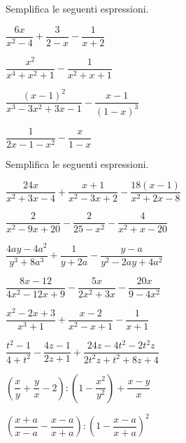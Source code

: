 \begin{esercizio}
\label{ese:19.34}
Semplifica le seguenti espressioni.
\begin{htmulticols}{2}
\begin{enumeratea}
\item \(\dfrac{6x}{x^{2}-4}+\dfrac{3}{2-x}-\dfrac{1}{x+2}\)
\item \(\dfrac{x^{2}}{x^{4}+x^{2}+1}-\dfrac{1}{x^{2}+x+1}\)
\item \(\dfrac{(x-1)^{2}}{x^{3}-3x^{2}+3x-1}-\dfrac{x-1}{(1-x)^{3}}\)
\item \(\dfrac{1}{2x-1-x^{2}}-\dfrac{x}{1-x}\)
\end{enumeratea}
\end{htmulticols}
\end{esercizio}

\begin{esercizio}[*]
\label{ese:19.35}
Semplifica le seguenti espressioni.
\begin{enumeratea}
\item 
\(\dfrac{24x}{x^{2}+3x-4}+\dfrac{x+1}{x^{2}-3x+2}-\dfrac{18(x-1)}{x^{2}+2x-8}\)
\item \(\dfrac{2}{x^{2}-9x+20}-\dfrac{2}{25-x^{2}}-\dfrac{4}{x^{2}+x-20}\)
\item 
\(\dfrac{4ay-4a^{2}}{y^{3}+8a^{3}}+\dfrac{1}{y+2a}-\dfrac{y-a}{y^{2}-2ay+4a^{2}}
\)
\item 
\(\dfrac{8x-12}{4x^{2}-12x+9}-\dfrac{5x}{2x^{2}+3x}-\dfrac{20x}{9-4x^{2}}\)
\item 
\(\dfrac{x^{{2}}-2x+3}{x^{{3}}+1}+\dfrac{x-2}{x^{{2}}-x+1}-\dfrac{1}{x+1}\)
\item \(\dfrac{t^{2}-1}{4+t^{2}}-\dfrac{4z-1}{2z+1}+
\dfrac{24z-4t^{2}-2t^{2}z}{2t^{2}z+t^{2}+8z+4}\)
\item \(\left(\dfrac{x}{y}+\dfrac{y}{x}-2\right):\left(1-
\dfrac{x^{2}}{y^{2}}\right)+\dfrac{x-y}{x}\)
\item \(\left(\dfrac{x+a}{x-a}-\dfrac{x-a}{x+a}\right):
\left(1-\dfrac{x-a}{x+a}\right)^{2}\)
\end{enumeratea}
\end{esercizio}

